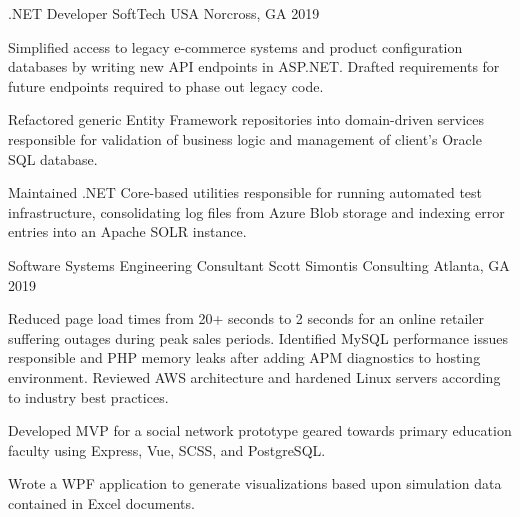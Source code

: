 \begin{cventries}
  \cventry
    {.NET Developer} %
    {SoftTech USA} %
    {Norcross, GA} %
    {2019} %
    {
      \begin{cvitems} %
        \item {Simplified access to legacy e-commerce systems and product configuration databases by writing new API endpoints in ASP.NET. Drafted requirements for future endpoints required to phase out legacy code.}
        \item {Refactored generic Entity Framework repositories into domain-driven services responsible for validation of business logic and management of client's Oracle SQL database.}
        \item {Maintained .NET Core-based utilities responsible for running automated test infrastructure, consolidating log files from Azure Blob storage and indexing error entries into an Apache SOLR instance.}
      \end{cvitems}
    }

  \cventry
    {Software Systems Engineering Consultant} %
    {Scott Simontis Consulting} %
    {Atlanta, GA} %
    {2019} %
    {
      \begin{cvitems} %
        \item {Reduced page load times from 20+ seconds to 2 seconds for an online retailer suffering outages during peak sales periods. Identified MySQL performance issues responsible and PHP memory leaks after adding APM diagnostics to hosting environment. Reviewed AWS architecture and hardened Linux servers according to industry best practices.}
        \item {Developed MVP for a social network prototype geared towards primary education faculty using Express, Vue, SCSS, and PostgreSQL.}
        \item {Wrote a WPF application to generate visualizations based upon simulation data contained in Excel documents.}
      \end{cvitems}
    }


\end{cventries}
